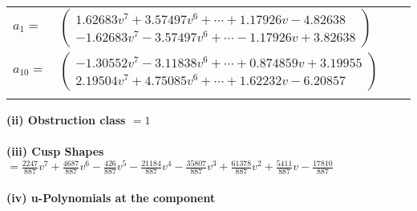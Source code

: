 \documentclass[1p]{elsarticle_modified}
\theoremstyle{definition}
\begin{document}
\begin{tabular}{m{7pt} m{180pt} m{7pt} m{180pt} }
\flushright $a_{1}=$&$\begin{pmatrix}1.62683 v^{7}+3.57497 v^{6}+\cdots+1.17926 v-4.82638\\-1.62683 v^{7}-3.57497 v^{6}+\cdots-1.17926 v+3.82638\end{pmatrix}$ \\
\flushright $a_{10}=$&$\begin{pmatrix}-1.30552 v^{7}-3.11838 v^{6}+\cdots+0.874859 v+3.19955\\2.19504 v^{7}+4.75085 v^{6}+\cdots+1.62232 v-6.20857\end{pmatrix}$\\&\end{tabular}
\flushleft \textbf{(ii) Obstruction class $= 1$}\\~\\
\flushleft \textbf{(iii) Cusp Shapes $= \frac{2247}{887} v^7+\frac{4687}{887} v^6-\frac{426}{887} v^5-\frac{21184}{887} v^4-\frac{35807}{887} v^3+\frac{61378}{887} v^2+\frac{5411}{887} v-\frac{17810}{887}$}\\~\\
\newpage\renewcommand{\arraystretch}{1}
\flushleft \textbf{(iv) u-Polynomials at the component}\newline \\
\end{document}
